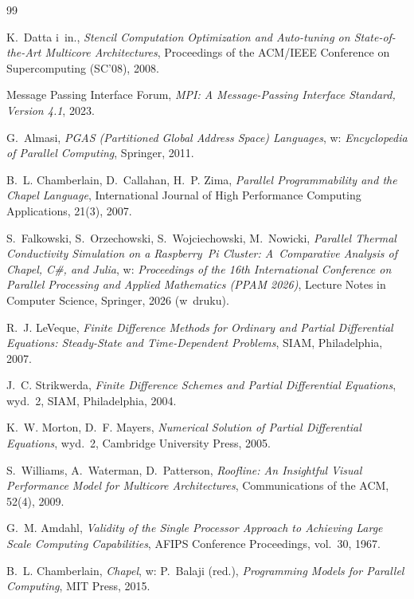 \cleardoublepage
{}
\begin{thebibliography}{99}

K.~Datta i~in.,
\emph{Stencil Computation Optimization and Auto-tuning on State-of-the-Art Multicore
Architectures},
Proceedings of the ACM/IEEE Conference on Supercomputing (SC'08), 2008.

Message Passing Interface Forum,
\emph{MPI: A Message-Passing Interface Standard, Version 4.1}, 2023.

G.~Almasi,
\emph{PGAS (Partitioned Global Address Space) Languages},
w: \emph{Encyclopedia of Parallel Computing}, Springer, 2011.

B.~L. Chamberlain, D.~Callahan, H.~P. Zima,
\emph{Parallel Programmability and the Chapel Language},
International Journal of High Performance Computing Applications, 21(3), 2007.

S.~Falkowski, S.~Orzechowski, S.~Wojciechowski, M.~Nowicki,
\emph{Parallel Thermal Conductivity Simulation on a Raspberry~Pi Cluster: A~Comparative
Analysis of Chapel, C\#, and Julia},
w: \emph{Proceedings of the 16th International Conference on Parallel Processing and
Applied Mathematics (PPAM 2026)}, Lecture Notes in Computer Science, Springer, 2026
(w~druku).

R.~J. LeVeque,
\emph{Finite Difference Methods for Ordinary and Partial Differential Equations:
Steady-State and Time-Dependent Problems},
SIAM, Philadelphia, 2007.

J.~C. Strikwerda,
\emph{Finite Difference Schemes and Partial Differential Equations}, wyd.~2,
SIAM, Philadelphia, 2004.

K.~W. Morton, D.~F. Mayers,
\emph{Numerical Solution of Partial Differential Equations}, wyd.~2,
Cambridge University Press, 2005.

S.~Williams, A.~Waterman, D.~Patterson,
\emph{Roofline: An Insightful Visual Performance Model for Multicore Architectures},
Communications of the ACM, 52(4), 2009.

G.~M. Amdahl,
\emph{Validity of the Single Processor Approach to Achieving Large Scale Computing
Capabilities},
AFIPS Conference Proceedings, vol.~30, 1967.

B.~L. Chamberlain,
\emph{Chapel},
w: P.~Balaji (red.), \emph{Programming Models for Parallel Computing},
MIT Press, 2015.


\end{thebibliography}
